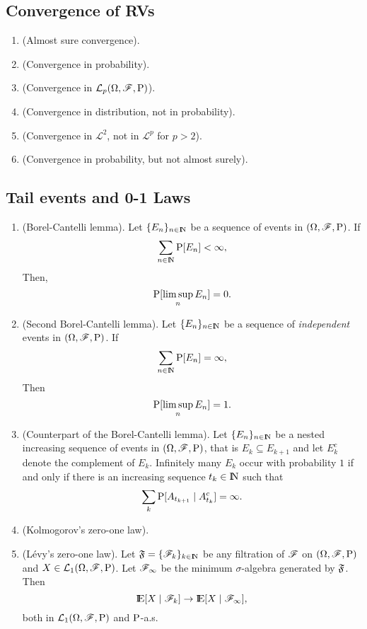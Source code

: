 \documentclass[a4paper,10pt]{article}
\begin{document}
\subsection{Convergence of RVs}
\begin{enumerate}
 \item (Almost sure convergence).
 \item (Convergence in probability).
 \item (Convergence in $\mathcal{L}_p(\Omega,\mathscr{F},\mathrm{P})$).
 \item (Convergence in distribution, not in probability).
 \item (Convergence in $\mathcal{L}^2$, not in $\mathcal{L}^p$ for $p>2$).
 \item (Convergence in probability, but not almost surely).
\end{enumerate}


\subsection{Tail events and 0-1 Laws}
\begin{enumerate}
 \item (Borel-Cantelli lemma). Let $\{E_n\}_{n\in\N}$ be a sequence of events in $(\Omega,\mathscr{F},\mathrm{P})$. If
 \[
  \sum_{n\in\N}\prob[E_n] < \infty,
 \]
 Then,
 \[
  \mathrm{P}[\limsup_n E_n] = 0.
 \]

 \item (Second Borel-Cantelli lemma). Let $\{E_n\}_{n\in\N}$ be a sequence of \textit{independent} events in $(\Omega,\mathscr{F},\mathrm{P})$. If
 \[
  \sum_{n\in\N}\prob[E_n] = \infty,
 \]
 Then
 \[
  \mathrm{P}[\limsup_n E_n] = 1.
 \]
 \item (Counterpart of the Borel-Cantelli lemma). 
 Let $\{E_n\}_{n\in\N}$ be a nested increasing sequence of events in $(\Omega,\mathscr{F},\mathrm{P})$, that is 
 $E_k\subseteq E_{k+1}$ and let $E_k^c$ denote the complement of $E_k$.
 Infinitely many $E_k$ occur with probability $1$ if and only if there is an increasing sequence 
 $t_k\in\N$ such that
 \[
  \sum_k \mathrm{P}[A_{t_{k+1}}\mid A_{t_k}^c]  = \infty.
 \]

 \item (Kolmogorov's zero-one law).
 
 \item (L\'evy's zero-one law). Let $\Ff=\{\F_k\}_{k\in\N}$ be any filtration of $\mathscr{F}$ on $(\Omega,\mathscr{F},\mathrm{P})$ and
 $X\in\mathcal{L}_1(\Omega,\mathscr{F},\mathrm{P})$. Let $\mathscr{F}_\infty$ be the minimum $\sigma$-algebra generated by $\mathfrak{F}$. Then
 \[
  \E[X\mid \F_k] \to \E[X\mid \F_\infty], 
 \]
 both in $\mathcal{L}_1(\Omega,\mathscr{F},\mathrm{P})$ and $\mathrm{P}$-a.s.

 

\end{enumerate}
\end{document}
